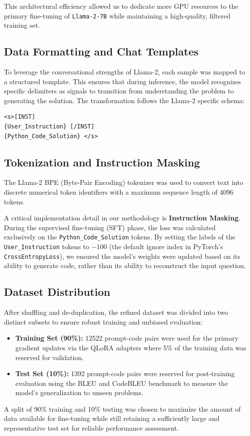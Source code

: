 This architectural efficiency allowed us to dedicate more GPU resources to the primary fine-tuning of \texttt{Llama-2-7B} while maintaining a high-quality, filtered training set.

\subsection{Data Formatting and Chat Templates}
To leverage the conversational strengths of Llama-2, each sample was mapped to a structured template. This ensures that during inference, the model recognizes specific delimiters as signals to transition from understanding the problem to generating the solution. The transformation follows the Llama-2 specific schema:

\begin{verbatim}
<s>[INST] 
{User_Instruction} [/INST] 
{Python_Code_Solution} </s>
\end{verbatim}


\subsection{Tokenization and Instruction Masking}
The Llama-2 BPE (Byte-Pair Encoding) tokenizer was used to convert text into discrete numerical token identifiers with a maximum sequence length of 4096 tokens. 

A critical implementation detail in our methodology is \textbf{Instruction Masking}. During the supervised fine-tuning (SFT) phase, the loss was calculated exclusively on the \texttt{Python\_Code\_Solution} tokens. By setting the labels of the \texttt{User\_Instruction} tokens to $-100$ (the default ignore index in PyTorch's \texttt{CrossEntropyLoss}), we ensured the model's weights were updated based on its ability to generate code, rather than its ability to reconstruct the input question.

\subsection{Dataset Distribution}
After shuffling and de-duplication, the refined dataset was divided into two distinct subsets to ensure robust training and unbiased evaluation:
\begin{itemize}
    \item \textbf{Training Set (90\%):} 12522 prompt-code pairs were used for the primary gradient updates via the QLoRA adapters where 5\% of the training data was reserved for validation.
    \item \textbf{Test Set (10\%):} 1392 prompt-code pairs were reserved for post-training evaluation using the BLEU and CodeBLEU benchmark to measure the model's generalization to unseen problems.
\end{itemize}
A split of 90\% training and 10\% testing was chosen to maximize the amount of data available for fine-tuning while still retaining a sufficiently large and representative test set for reliable performance assessment.

